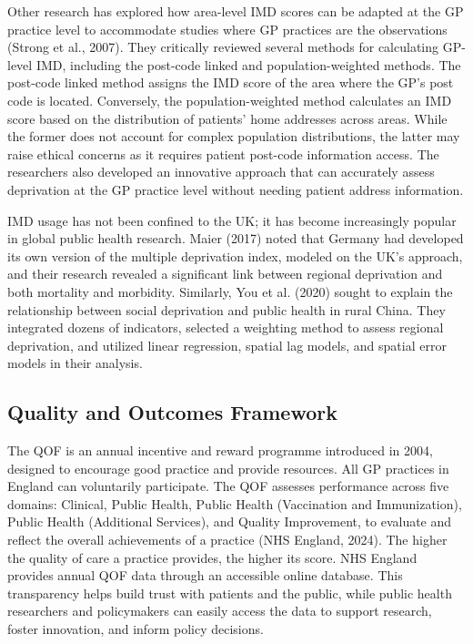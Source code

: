 Other research has explored how area-level IMD scores can be adapted at the GP practice level to accommodate studies where GP practices are the observations (Strong et al., 2007). They critically reviewed several methods for calculating GP-level IMD, including the post-code linked and population-weighted methods. The post-code linked method assigns the IMD score of the area where the GP's post code is located. Conversely, the population-weighted method calculates an IMD score based on the distribution of patients' home addresses across areas. While the former does not account for complex population distributions, the latter may raise ethical concerns as it requires patient post-code information access. The researchers also developed an innovative approach that can accurately assess deprivation at the GP practice level without needing patient address information.

IMD usage has not been confined to the UK; it has become increasingly popular in global public health research. Maier (2017) noted that Germany had developed its own version of the multiple deprivation index, modeled on the UK's approach, and their research revealed a significant link between regional deprivation and both mortality and morbidity. Similarly, You et al. (2020) sought to explain the relationship between social deprivation and public health in rural China. They integrated dozens of indicators, selected a weighting method to assess regional deprivation, and utilized linear regression, spatial lag models, and spatial error models in their analysis.

\subsection{Quality and Outcomes Framework}
\label{sec:2.4.2}
The QOF is an annual incentive and reward programme introduced in 2004, designed to encourage good practice and provide resources. All GP practices in England can voluntarily participate. The QOF assesses performance across five domains: Clinical, Public Health, Public Health (Vaccination and Immunization), Public Health (Additional Services), and Quality Improvement, to evaluate and reflect the overall achievements of a practice (NHS England, 2024). The higher the quality of care a practice provides, the higher its score. NHS England provides annual QOF data through an accessible online database. This transparency helps build trust with patients and the public, while public health researchers and policymakers can easily access the data to support research, foster innovation, and inform policy decisions.

